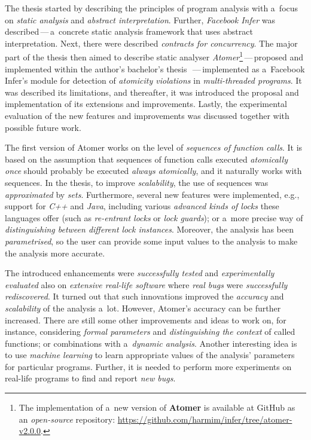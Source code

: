 The thesis started by describing the principles of program analysis with a~focus on \emph{static analysis} and \emph{abstract interpretation}. Further, \emph{Facebook Infer} was described\,---\,a~concrete static analysis framework that uses abstract interpretation. Next, there were described \emph{contracts for concurrency}. The major part of the thesis then aimed to describe static analyser \emph{Atomer}\footnote{The implementation of a~new version of \textbf{Atomer} is available at GitHub as an \emph{open-source} repository: \url{https://github.com/harmim/infer/tree/atomer-v2.0.0}.}\,---\,proposed and implemented within the author's bachelor's thesis~\cite{harmimBP}\,---\,implemented as a~Facebook Infer's module for detection of \emph{atomicity violations} in \emph{multi-threaded programs}. It was described its limitations, and thereafter, it was introduced the proposal and implementation of its extensions and improvements. Lastly, the experimental evaluation of the new features and improvements was discussed together with possible future work.

\vspace{-.2em}

The first version of Atomer works on the level of \emph{sequences of function calls}. It is based on the assumption that sequences of function calls executed \emph{atomically once} should probably be executed \emph{always atomically}, and it naturally works with sequences. In the thesis, to improve \emph{scalability}, the use of sequences was \emph{approximated} by \emph{sets}. Furthermore, several new features were implemented, e.g., support for \emph{C++} and \emph{Java}, including various \emph{advanced kinds of locks} these languages offer (such as \emph{re-entrant locks} or \emph{lock guards}); or a~more precise way of \emph{distinguishing between different lock instances}. Moreover, the analysis has been \emph{parametrised}, so the user can provide some input values to the analysis to make the analysis more accurate.

\vspace{-.2em}

The introduced enhancements were \emph{successfully tested} and \emph{experimentally evaluated} also on \emph{extensive real-life software} where \emph{real bugs} were \emph{successfully rediscovered}. It turned out that such innovations improved the \emph{accuracy} and \emph{scalability} of the analysis a~lot. However, Atomer's accuracy can be further increased. There are still some other improvements and ideas to work on, for instance, considering \emph{formal parameters} and \emph{distinguishing the context} of called functions; or combinations with a~\emph{dynamic analysis}. Another interesting idea is to use \emph{machine learning} to learn appropriate values of the analysis' parameters for particular programs. Further, it is needed to perform more experiments on real-life programs to find and report \emph{new bugs}.

